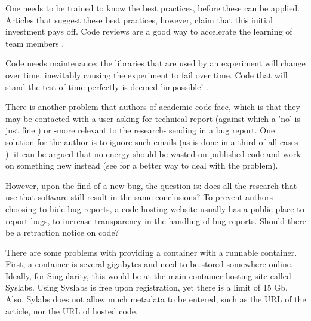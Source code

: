 One needs to be trained to know the best practices,
before these can be applied. 
Articles that suggest these best practices, however, claim that this initial
investment pays off.
Code reviews are a good way to accelerate the 
learning of team members \cite{vable2021code}.


Code needs maintenance:
the libraries that are used by an experiment
will change over time, inevitably causing the experiment to fail
over time. 
Code that will stand the test of time perfectly 
is deemed 'impossible' \cite{benureau2018re}.


There is another problem that authors of academic code face,
which is that they may be contacted with a user 
asking for technical report 
(against which a 'no' is just fine \cite{barnes2010publish})
or -more relevant to the research- sending in a bug report.
One solution for the author is to ignore such emails (as is done in a third
of all cases \cite{teunis2015corresponding}):
it can be argued that no energy should be wasted on published code
and work on something new instead 
(see \cite{barnes2010publish} for a better way to deal with the problem).




However, upon the find of a new bug, the question is:
does all the research that use that software still 
result in the same conclusions?
To prevent authors choosing to hide bug reports, 
a code hosting website usually has a public place to report bugs,
to increase transparency in the handling of bug reports.
Should there be a retraction notice on code?


There are some problems with providing a container with a runnable container.
First, a container is several gigabytes and need to be stored somewhere
online. 
Ideally, for Singularity, this would be at the main container hosting
site called Syslabs. Using Syslabs is free upon registration, 
yet there is a limit of 15 Gb. Also, Sylabs does not allow much metadata to
be entered, such as the URL of the article, nor the URL of hosted code.

